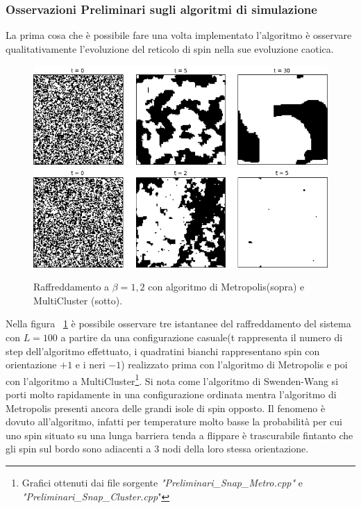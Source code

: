 \documentclass[11pt]{article}
\theoremstyle{plain}
\begin{document}
\subsubsection*{Osservazioni Preliminari sugli algoritmi di simulazione}
La prima cosa che è possibile fare una volta implementato l'algoritmo è osservare qualitativamente l'evoluzione del reticolo di spin nella sue evoluzione caotica.
   \begin {figure}
      \begin{center}
      	\caption{\footnotesize Raffreddamento a $\beta = 1,2 $ con algoritmo di Metropolis(sopra) e MultiCluster (sotto).}\label{fig:3}
        \includegraphics[scale=0.5]{Immagini/Metro_raffreddamento.jpg}
        \includegraphics[scale=0.5]{Immagini/Cluster_raffreddamento.jpg}
      \end{center}
    \end {figure}     

   
Nella figura ~\ref{fig:3} è possibile osservare tre istantanee del raffreddamento del sistema con $L=100$ a partire da una configurazione casuale(t rappresenta il numero di step dell'algoritmo effettuato, i quadratini bianchi rappresentano spin con orientazione $+1$ e i neri $-1$) realizzato prima con l'algoritmo di Metropolis e poi con l'algoritmo a MultiCluster\footnote{Grafici ottenuti dai file sorgente \emph{"Preliminari\_Snap\_Metro.cpp"} e \emph{"Preliminari\_Snap\_Cluster.cpp}"}. 
Si nota come l'algoritmo di Swenden-Wang si porti molto rapidamente in una configurazione ordinata mentra l'algoritmo di Metropolis presenti ancora delle grandi isole di spin opposto.
Il fenomeno è dovuto all'algoritmo, infatti per temperature molto basse la probabilità per cui uno spin situato su una lunga barriera tenda a flippare è trascurabile fintanto che gli spin sul bordo sono adiacenti a 3 nodi della loro stessa orientazione.
\end{document}
